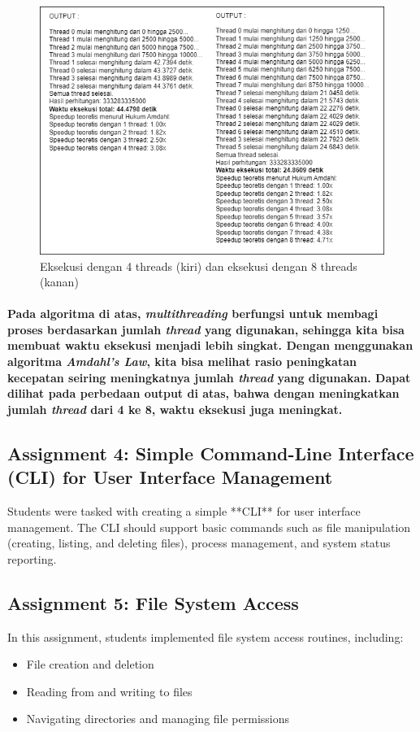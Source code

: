 \documentclass[12pt]{article}
\begin{document}
\begin{figure}[H]
    \centering
    \includegraphics[width=1\linewidth]{asset/31.png}
    \caption{Eksekusi dengan 4 threads (kiri) dan eksekusi dengan 8 threads (kanan)}
\end{figure}

\paragraph{
    \hspace*{1cm} Pada algoritma di atas, \textit{multithreading} berfungsi untuk membagi proses berdasarkan jumlah \textit{thread} yang digunakan, sehingga kita bisa membuat waktu eksekusi menjadi lebih singkat. Dengan menggunakan algoritma \textit{Amdahl's Law}, kita bisa melihat rasio peningkatan kecepatan seiring meningkatnya jumlah \textit{thread} yang digunakan. Dapat dilihat pada perbedaan output di atas, bahwa dengan meningkatkan jumlah \textit{thread} dari 4 ke 8, waktu eksekusi juga meningkat.
}



\subsection{Assignment 4: Simple Command-Line Interface (CLI) for User Interface Management}
Students were tasked with creating a simple **CLI** for user interface management. The CLI should support basic commands such as file manipulation (creating, listing, and deleting files), process management, and system status reporting.

\subsection{Assignment 5: File System Access}
In this assignment, students implemented file system access routines, including:
\begin{itemize}
    \item File creation and deletion
    \item Reading from and writing to files
    \item Navigating directories and managing file permissions
\end{itemize}
\end{document}
